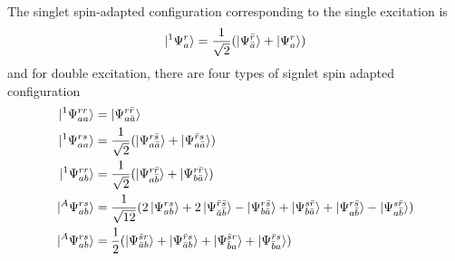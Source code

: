 \documentclass[11pt]{article}
\begin{document}
The singlet spin-adapted configuration corresponding to the single excitation is
\begin{equation}
    \ket{ ^1\Psi_a^r}=\frac{1}{\sqrt{2}}(\ket{\Psi_{\bar{a}}^{\bar{r}}}+\ket{\Psi_a^r})
\end{equation}
and for double excitation, there are four types of signlet spin adapted configuration
\begin{align}
    \ket{ ^1\Psi_{aa}^{rr}}&=\ket{\Psi_{a\bar{a}}^{r\bar{r}}}\\
    \ket{ ^1\Psi_{aa}^{rs}}&=\frac{1}{\sqrt{2}}(\ket{\Psi_{a\bar{a}}^{r\bar{s}}}+\ket{\Psi_{a\bar{a}}^{\bar{r}s}})\\
    \ket{ ^1\Psi_{ab}^{rr}}&=\frac{1}{\sqrt{2}}(\ket{\Psi_{a\bar{b}}^{r\bar{r}}}+\ket{\Psi_{b\bar{a}}^{r\bar{r}}})\\
    \ket{ ^A\Psi_{ab}^{rs}}&=\frac{1}{\sqrt{12}}(2\ket{\Psi_{ab}^{rs}}+2\ket{\Psi_{\bar{a}\bar{b}}^{\bar{r}\bar{s}}}-
    \ket{\Psi_{b\bar{a}}^{r\bar{s}}}+\ket{\Psi_{b\bar{a}}^{s\bar{r}}}+\ket{\Psi_{a\bar{b}}^{r\bar{s}}}-\ket{\Psi_{a\bar{b}}^{s\bar{r}}})\\
    \ket{ ^A\Psi_{ab}^{rs}}&=\frac{1}{2}(\ket{\Psi_{\bar{a}b}^{\bar{s}r}}+\ket{\Psi_{\bar{a}b}^{\bar{r}s}}+\ket{\Psi_{\bar{b}a}^{\bar{s}r}}+\ket{\Psi_{\bar{b}a}^{\bar{r}s}})
\end{align}
\end{document}
